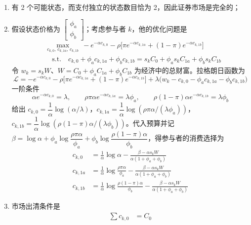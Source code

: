 \begin{solution}
\begin{enumerate}[label=(\alph*)]
    \item 有 2 个可能状态，而支付独立的状态数目恰为 2，因此证券市场是完全的；
    \item 假设状态价格为 $\begin{bmatrix}\phi_{a} \\ \phi_{b}\end{bmatrix}$；考虑参与者 $k$，他的优化问题是
    \[
        \begin{aligned}
            &\max_{c_{k,0},\,c_{k,1a},\,c_{k,1b}}\ -e^{-\alpha c_{k,0}}-\rho\bigl[\pi e^{-\alpha c_{k,1a}}+(1-\pi)e^{-\alpha c_{k,1b}}\bigr]\\
            &\quad\text{s.t.}\quad c_{k,0}+\phi_{a}c_{k,1a}+\phi_{b}c_{k,1b}=s_{k}C_{0}+\phi_{a}s_{k}C_{1a}+\phi_{b}s_{k}C_{1b}
        \end{aligned}
    \]
    令 $w_{k}=s_{k}W$、$W=C_{0}+\phi_{a}C_{1a}+\phi_{b}C_{1b}$ 为经济中的总财富。拉格朗日函数为
    \[
        \mathcal{L}=-e^{-\alpha c_{k,0}}-\rho\bigl[\pi e^{-\alpha c_{k,1a}}+(1-\pi)e^{-\alpha c_{k,1b}}\bigr]+\lambda\bigl(w_{k}-c_{k,0}-\phi_{a}c_{k,1a}-\phi_{b}c_{k,1b}\bigr)
    \]
    一阶条件
    \[
        \alpha e^{-\alpha c_{k,0}}=\lambda,\qquad
        \rho\pi\alpha e^{-\alpha c_{k,1a}}=\lambda\phi_{a},\qquad
        \rho(1-\pi)\alpha e^{-\alpha c_{k,1b}}=\lambda\phi_{b}
    \]
    给出 $c_{k,0}=\dfrac{1}{\alpha}\log(\alpha/\lambda)$，$c_{k,1a}=\dfrac{1}{\alpha}\log(\rho\pi\alpha/(\lambda\phi_{a}))$，$c_{k,1b}=\dfrac{1}{\alpha}\log(\rho(1-\pi)\alpha/(\lambda\phi_{b}))$。代入预算并记 $\beta=\log\alpha+\phi_{a}\log\dfrac{\rho\pi\alpha}{\phi_{a}}+\phi_{b}\log\dfrac{\rho(1-\pi)\alpha}{\phi_{b}}$，得参与者的消费选择为
    \[
        \begin{aligned}
            c_{k,0}&=\frac{1}{\alpha}\log\alpha-\frac{\beta-\alpha s_{k}W}{\alpha(1+\phi_{a}+\phi_{b})}\\
            c_{k,1a}&=\frac{1}{\alpha}\log\frac{\rho\pi\alpha}{\phi_{a}}-\frac{\beta-\alpha s_{k}W}{\alpha(1+\phi_{a}+\phi_{b})}\\
            c_{k,1b}&=\frac{1}{\alpha}\log\frac{\rho(1-\pi)\alpha}{\phi_{b}}-\frac{\beta-\alpha s_{k}W}{\alpha(1+\phi_{a}+\phi_{b})}
        \end{aligned}
    \]
    \item 市场出清条件是
    \[
        \begin{aligned}
            \sum c_{k,0}&=C_{0}\\

\end{aligned}\]
\end{enumerate}
\end{solution}
